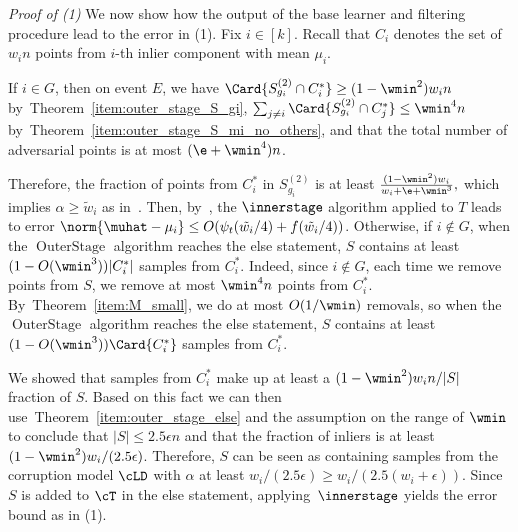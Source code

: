 \emph{Proof of (1)}
We now show how the output of the base learner and filtering procedure lead to the error in (1).
Fix \(i \in [k]\).  Recall that \(C_i\) denotes the set of \(w_i n\) points from \(i\)-th inlier component with mean \(\mu_i\).

If \(i \in G\), then on event $E$,
we have 
\(\Card{S_{g_i}^{(2)} \cap C^*_i} \geq (1 - \wmin^2) w_i n\) by~Theorem~\ref{item:outer_stage_S_gi}, \(\sum_{j \neq i}\Card{S_{g_i}^{(2)} \cap C^*_j} \leq \wmin^4 n\) by~Theorem~\ref{item:outer_stage_S_mi_no_others}, and that the total number of adversarial points is at most \((\e + \wmin^4)n\). 

Therefore, the fraction of points from \(C^*_i\) in \(S_{g_i}^{(2)}\) is at least
\(
\frac{(1 - \wmin^2) w_i }{w_i + \e + \wmin^3},
\)
which implies \(\alpha \geq \tilde w_i\) as in~.
Then, by~, the \(\innerstage\) algorithm applied to \(T\) leads to error $\norm{\muhat - \mu_i} \leq O(\psi_t(\tilde{w_i}/4 )+f(\tilde{w_i}/4))$. 
Otherwise, if $i \not \in G$, when the \(\operatorname{OuterStage}\) algorithm 
reaches the else statement, $S$ contains at least $(1-O(\wmin^3)) |C^*_i|$ samples from $C^*_i$. Indeed, since \(i \notin G\), each time we remove points from \(S\), we remove at most \(\wmin^4 n\) points from \(C^*_i\). By~Theorem~\ref{item:M_small}, we do at most \(O(1 / \wmin)\) removals, so when the \(\operatorname{OuterStage}\) algorithm reaches the else statement, \(S\) contains at least \((1 - O(\wmin^3))\Card{C^*_i}\) samples from \(C^*_i\).

We showed that samples from $C^*_i$ make up at least a $(1-\wmin^2)w_i n/|S|$ fraction of $S$. 
Based on this fact we can then use~Theorem~\ref{item:outer_stage_else} and the assumption on the range of $\wmin$ to conclude that  $|S| \leq 2.5 \epsilon n$ and that the fraction of inliers is at least $(1-\wmin^2)w_i/(2.5 \epsilon)$. 
Therefore, $S$ can be seen as containing samples from the corruption model \(\cLD\) with 
$\alpha$ at least $w_i/(2.5 \epsilon) \geq w_i/(2.5 (w_i+\epsilon))$. Since \(S\) is added to \(\cT\) in the else statement, applying~\(\innerstage\) yields the error bound as in (1).\\


